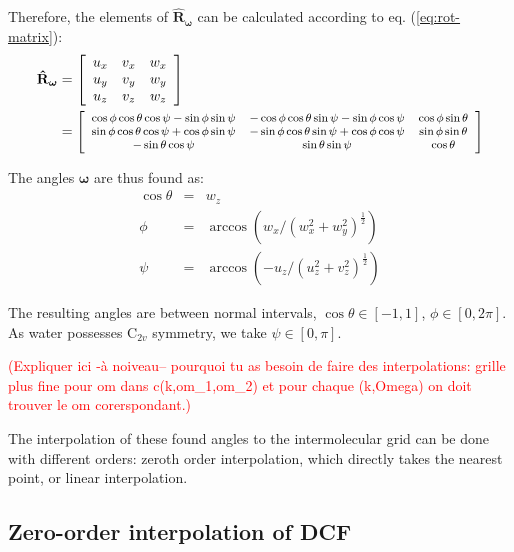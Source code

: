 Therefore, the elements of $\mathbf{\hat{R}}_{\boldsymbol{\omega}}$
can be calculated according to eq. (\ref{eq:rot-matrix}):
\begin{align}
\mathbf{\hat{R}}_{\boldsymbol{\omega}} & =\left[\begin{array}{ccc}
u_{x} & v_{x} & w_{x}\\
u_{y} & v_{y} & w_{y}\\
u_{z} & v_{z} & w_{z}
\end{array}\right]\\
 & =\footnotesize\left[\begin{array}{ccc}
\cos\phi\cos\theta\cos\psi-\sin\phi\sin\psi & -\cos\phi\cos\theta\sin\psi-\sin\phi\cos\psi & \cos\phi\sin\theta\\
\sin\phi\cos\theta\cos\psi+\cos\phi\sin\psi & -\sin\phi\cos\theta\sin\psi+\cos\phi\cos\psi & \sin\phi\sin\theta\\
-\sin\theta\cos\psi & \sin\theta\sin\psi & \cos\theta
\end{array}\right]\nonumber 
\end{align}


The angles $\boldsymbol{\omega}$ are thus found as:
\begin{eqnarray}
\cos\theta & = & w_{z}\nonumber \\
\phi & = & \arccos(w_{x}/(w_{x}^{2}+w_{y}^{2})^{\frac{1}{2}})\label{eq:omega}\\
\psi & = & \arccos(-u_{z}/(u_{z}^{2}+v_{z}^{2})^{\frac{1}{2}})\nonumber 
\end{eqnarray}


The resulting angles are between normal intervals, $\cos\theta\in\left[-1,1\right]$,
$\phi\in\left[0,2\pi\right]$. As water possesses $\mathrm{C}_{2v}$
symmetry, we take $\psi\in\left[0,\pi\right]$. 

\textcolor{red}{(Expliquer ici -à noiveau-- pourquoi tu as besoin
de faire des interpolations: grille plus fine pour om dans c(k,om\_1,om\_2)
et pour chaque (k,Omega) on doit trouver le om corerspondant.)}

The interpolation of these found angles to the intermolecular grid
can be done with different orders: zeroth order interpolation, which
directly takes the nearest point, or linear interpolation.


\subsection{Zero-order interpolation of DCF\label{sub:Zero-order-interpolation-of}}

